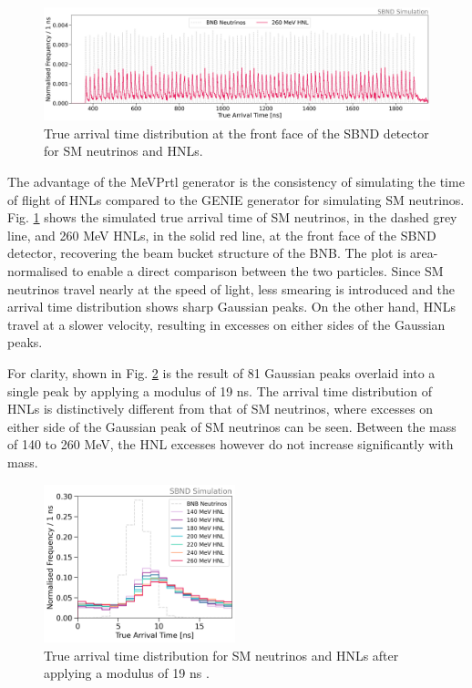 \begin{figure}[b!] 
\centering    
\includegraphics[width=1.0\textwidth]{full_beam}
\caption[Arrival Time of SM Neutrinos and HNLs at the Front Face of SBND]{
True arrival time distribution at the front face of the SBND detector for SM neutrinos and HNLs. 
}
\label{fig:full_beam}
\end{figure}

The advantage of the MeVPrtl generator is the consistency of simulating the time of flight of HNLs compared to the GENIE generator \cite{genie} for simulating SM neutrinos.
Fig. \ref{fig:full_beam} shows the simulated true arrival time of SM neutrinos, in the dashed grey line, and 260 MeV HNLs, in the solid red line, at the front face of the SBND detector, recovering the beam bucket structure of the BNB.
The plot is area-normalised to enable a direct comparison between the two particles. 
Since SM neutrinos travel nearly at the speed of light, less smearing is introduced and the arrival time distribution shows sharp Gaussian peaks.
On the other hand, HNLs travel at a slower velocity, resulting in excesses on either sides of the Gaussian peaks.

For clarity, shown in Fig. \ref{fig:beam_modulus} is the result of 81 Gaussian peaks overlaid into a single peak by applying a modulus of 19 ns.
The arrival time distribution of HNLs is distinctively different from that of SM neutrinos, where excesses on either side of the Gaussian peak of SM neutrinos can be seen.
Between the mass of 140 to 260 MeV, the HNL excesses however do not increase significantly with mass.

\begin{figure}[ht!] 
\vspace{0.5cm}
\centering    
\includegraphics[width=0.495\textwidth]{beam_modulus}
\caption[Modulus of the Arrival Time Distibutions of SM Neutrinos and HNLs]{
True arrival time distribution for SM neutrinos and HNLs after applying a modulus of 19 ns . 
}
\label{fig:beam_modulus}
\end{figure}

